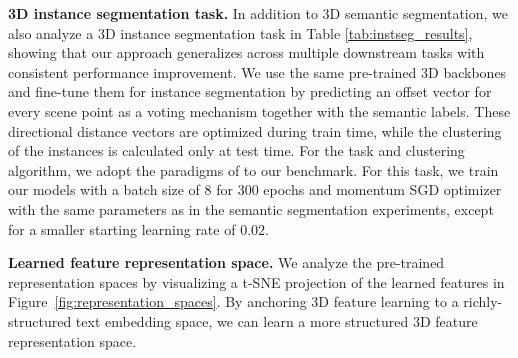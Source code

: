 \smallskip
\noindent \textbf{3D instance segmentation task.}
In addition to 3D semantic segmentation, we also analyze a 3D instance segmentation task in Table \ref{tab:instseg_results}, showing that our approach generalizes across multiple downstream tasks with consistent performance improvement.
We use the same pre-trained 3D backbones and fine-tune them for instance segmentation by predicting an offset vector for every scene point as a voting mechanism together with the semantic labels. These directional distance vectors are optimized during train time, while the clustering of the instances is calculated only at test time. For the task and clustering algorithm, we adopt the paradigms of  \cite{jiang2020pointgroup,scene_contrast} to our \OURS{} benchmark. For this task, we train our models with a batch size of $8$ for $300$ epochs and momentum SGD optimizer with the same parameters as in the semantic segmentation experiments, except for a smaller starting learning rate of $0.02$.
\begin{table}
\centering
{}
\caption{3D instance segmentation, in comparison with training from scratch and state-of-the-art 3D pre-training approach CSC~\cite{scene_contrast}. Our language-grounded pre-training improves over both baselines.}
\label{tab:instseg_results}
\end{table}

\noindent \textbf{Learned feature representation space.}
We analyze the pre-trained representation spaces by visualizing a t-SNE projection of the learned features in Figure~\ref{fig:representation_spaces}.
By anchoring 3D feature learning to a richly-structured text embedding space, we can learn a more structured 3D feature representation space. 

